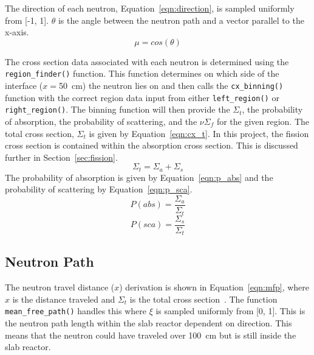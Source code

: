 \documentclass[letterpaper]{article}
\begin{document}
The direction of each neutron, Equation~\ref{eqn:direction}, is sampled uniformly from [-1, 1]. $\theta$ is the angle between the neutron path and a vector parallel to the x-axis. 
\begin{equation}
    \mu=cos(\theta)
    \label{eqn:direction}
\end{equation}

The cross section data associated with each neutron is determined using the \texttt{region\_finder()} function. This function determines on which side of the interface ($x=$\SI{50}{\cm}) the neutron lies on and then calls the \texttt{cx\_binning()} function with the correct region data input from either \texttt{left\_region()} or \texttt{right\_region()}. The binning function will then provide the $\Sigma_t$, the probability of absorption, the probability of scattering, and the $\nu\Sigma_f$ for the given region. The total cross section, $\Sigma_t$ is given by Equation~\ref{eqn:cx_t}. In this project, the fission cross section is contained within the absorption cross section. This is discussed further in Section~\ref{sec:fission}.
\begin{equation}
    \Sigma_t = \Sigma_a+\Sigma_s
    \label{eqn:cx_t}
\end{equation}
The probability of absorption is given by Equation~\ref{eqn:p_abs} and the probability of scattering by Equation~\ref{eqn:p_sca}.
\begin{equation}
    P(abs)=\frac{\Sigma_a}{\Sigma_t}
    \label{eqn:p_abs}
\end{equation}
\begin{equation}
    P(sca) = \frac{\Sigma_s}{\Sigma_t}
    \label{eqn:p_sca}
\end{equation}

\subsection{Neutron Path}
The neutron travel distance ($x$) derivation is shown in Equation~\ref{eqn:mfp}, where $x$ is the distance traveled and $\Sigma_t$ is the total cross section~\cite{Stacey}. The function \texttt{mean\_free\_path()} handles this where $\xi$ is sampled uniformly from [0, 1]. This is the neutron path length within the slab reactor dependent on direction. This means that the neutron could have traveled over \SI{100}{\cm} but is still inside the slab reactor.
\end{document}
